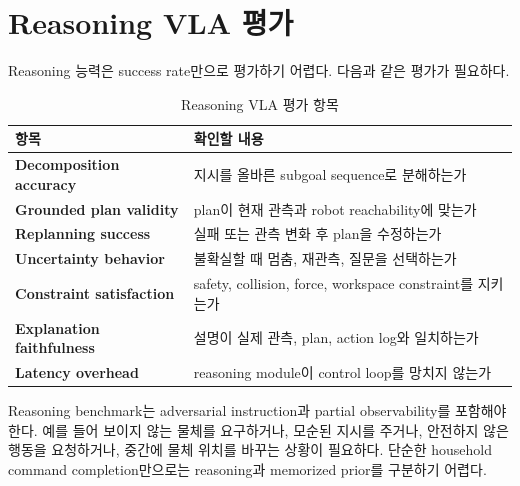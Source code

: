 \section{Reasoning VLA 평가}

Reasoning 능력은 success rate만으로 평가하기 어렵다. 다음과 같은 평가가 필요하다.

\begin{table}[t]
  \centering
  \caption{Reasoning VLA 평가 항목}
  \label{tab:reasoning_vla_eval}
  \begin{tabularx}{\textwidth}{>{\bfseries}p{34mm}X}
    \toprule
    항목 & 확인할 내용 \\
    \midrule
    Decomposition accuracy & 지시를 올바른 subgoal sequence로 분해하는가 \\
    Grounded plan validity & plan이 현재 관측과 robot reachability에 맞는가 \\
    Replanning success & 실패 또는 관측 변화 후 plan을 수정하는가 \\
    Uncertainty behavior & 불확실할 때 멈춤, 재관측, 질문을 선택하는가 \\
    Constraint satisfaction & safety, collision, force, workspace constraint를 지키는가 \\
    Explanation faithfulness & 설명이 실제 관측, plan, action log와 일치하는가 \\
    Latency overhead & reasoning module이 control loop를 망치지 않는가 \\
    \bottomrule
  \end{tabularx}
\end{table}

Reasoning benchmark는 adversarial instruction과 partial observability를 포함해야 한다. 예를 들어 보이지 않는 물체를 요구하거나, 모순된 지시를 주거나, 안전하지 않은 행동을 요청하거나, 중간에 물체 위치를 바꾸는 상황이 필요하다. 단순한 household command completion만으로는 reasoning과 memorized prior를 구분하기 어렵다.

